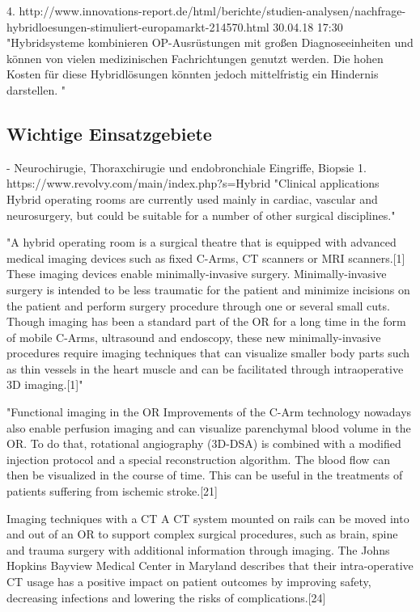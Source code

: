 4. http://www.innovations-report.de/html/berichte/studien-analysen/nachfrage-hybridloesungen-stimuliert-europamarkt-214570.html 30.04.18 17:30	
	"Hybridsysteme kombinieren OP-Ausrüstungen mit großen Diagnoseeinheiten und können von vielen medizinischen Fachrichtungen genutzt werden. Die hohen Kosten für diese Hybridlösungen könnten jedoch mittelfristig ein Hindernis darstellen. "
\subsection{Wichtige Einsatzgebiete}
- Neurochirugie, Thoraxchirugie und endobronchiale Eingriffe, Biopsie
1. https://www.revolvy.com/main/index.php?s=Hybrid%
	"Clinical applications
	Hybrid operating rooms are currently used mainly in cardiac, vascular and neurosurgery, but could be suitable for a number of other surgical disciplines."

	"A hybrid operating room is a surgical theatre that is equipped with advanced medical imaging devices such as fixed C-Arms, CT scanners or MRI scanners.[1] These imaging devices enable minimally-invasive surgery. Minimally-invasive surgery is intended to be less traumatic for the patient and minimize incisions on the patient and perform surgery procedure through one or several small cuts.
	Though imaging has been a standard part of the OR for a long time in the form of mobile C-Arms, ultrasound and endoscopy, these new minimally-invasive procedures require imaging techniques that can visualize smaller body parts such as thin vessels in the heart muscle and can be facilitated through intraoperative 3D imaging.[1]"
	
	"Functional imaging in the OR
	Improvements of the C-Arm technology nowadays also enable perfusion imaging and can visualize parenchymal blood volume in the OR. To do that, rotational angiography (3D-DSA) is combined with a modified injection protocol and a special reconstruction algorithm. The blood flow can then be visualized in the course of time. This can be useful in the treatments of patients suffering from ischemic stroke.[21]
	
	Imaging techniques with a CT
	A CT system mounted on rails can be moved into and out of an OR to support complex surgical procedures, such as brain, spine and trauma surgery with additional information through imaging. The Johns Hopkins Bayview Medical Center in Maryland describes that their intra-operative CT usage has a positive impact on patient outcomes by improving safety, decreasing infections and lowering the risks of complications.[24]
	
